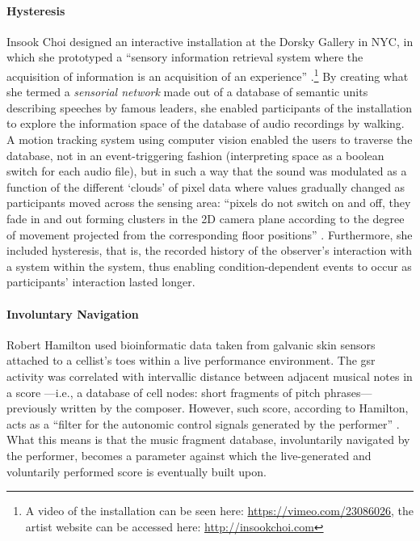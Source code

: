 \paragraph{Hysteresis}
Insook Choi \parencite{icmc/bbp2372.2000.146} designed an interactive installation at the Dorsky Gallery in NYC, in which she prototyped a ``sensory information retrieval system where the acquisition of information is an acquisition of an experience'' \parencite{icmc/bbp2372.2000.146}.\footnote{A video of the installation can be seen here: \url{https://vimeo.com/23086026}, the artist website can be accessed here: \url{http://insookchoi.com}} By creating what she termed a \textit{sensorial network} made out of a database of semantic units describing speeches by famous leaders, she enabled participants of the installation to explore the information space of the database of audio recordings by walking. A motion tracking system using computer vision enabled the users to traverse the database, not in an event-triggering fashion (interpreting space as a boolean switch for each audio file), but in such a way that the sound was modulated as a function of the different `clouds' of pixel data where values gradually changed as participants moved across the sensing area: ``pixels do not switch on and off, they fade in and out forming clusters in the 2D camera plane according to the degree of movement projected from the corresponding floor positions'' \parencite{icmc/bbp2372.2000.146}. Furthermore, she included hysteresis, that is, the recorded history of the observer's interaction with a system within the system, thus enabling condition-dependent events to occur as participants' interaction lasted longer.

\paragraph{Involuntary Navigation}
Robert Hamilton \parencite{icmc/bbp2372.2006.123} used bioinformatic data taken from galvanic skin sensors attached to a cellist's toes within a live performance environment. The \gls{gsr} activity was correlated with intervallic distance between adjacent musical notes in a score ---i.e., a database of cell nodes: short fragments of pitch phrases--- previously written by the composer. However, such score, according to Hamilton, acts as a ``filter for the autonomic control signals generated by the performer'' \parencite[601]{icmc/bbp2372.2006.123}. What this means is that the music fragment database, involuntarily navigated by the performer, becomes a parameter against which the live-generated and voluntarily performed score is eventually built upon.

